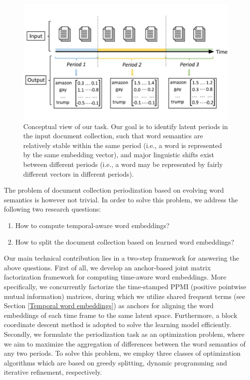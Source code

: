 \documentclass[output=paper]{langsci/langscibook}
\begin{document}
\begin{figure}[ht]
\centering
\includegraphics[width=1.0\textwidth,height=1.0\textheight,keepaspectratio]{figures/DUAN_overall}
\caption{Conceptual view of our task. Our goal is to identify latent periods in the input document collection, such that word semantics are relatively stable within the same period (i.e., a word is represented by the same embedding vector), and major linguistic shifts exist between different periods (i.e., a word may be represented by fairly different vectors in different periods).}\label{overall}
\end{figure}


The problem of document collection periodization based on evolving word semantics is however not trivial. In order to solve this problem, we address the following two research questions:\largerpage

\begin{enumerate}[label=\alph*.]
\item How to compute temporal-aware word embeddings?
\item How to split the document collection based on learned word embeddings?
\end{enumerate}

Our main technical contribution lies in a two-step framework for answering the above questions. First of all, we develop an anchor-based joint matrix factorization framework for computing time-aware word embeddings. More specifically, we concurrently factorize the time-stamped PPMI (positive pointwise mutual information) matrices, during which we utilize shared frequent terms (see Section \ref{Temporal word embeddings}) as anchors for aligning the word embeddings of each time frame to the same latent space. Furthermore, a block coordinate descent method is adopted to solve the learning model efficiently.
Secondly, we formulate the periodization task as an optimization problem, where we aim to maximize the aggregation of differences between the word semantics of any two periods. To solve this problem, we employ three classes of optimization algorithms which are based on greedy splitting, dynamic programming and iterative refinement, respectively. 
\end{document}
